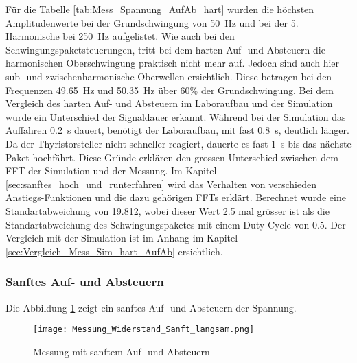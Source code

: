 Für die Tabelle \ref{tab:Mess_Spannung_AufAb_hart} wurden die höchsten Amplitudenwerte bei der Grundschwingung von \SI{50}{Hz} und bei der 5. Harmonische bei \SI{250}{Hz} aufgelistet.
Wie auch bei den Schwingungspaketsteuerungen, tritt bei dem harten Auf- und Absteuern die harmonischen Oberschwingung praktisch nicht mehr auf. Jedoch sind auch hier sub- und zwischenharmonische Oberwellen ersichtlich. Diese betragen bei den Frequenzen \SI{49.65}{Hz} und \SI{50.35}{Hz} über 60\% der Grundschwingung. Bei dem Vergleich des harten Auf- und Absteuern im Laboraufbau und der Simulation wurde ein Unterschied der Signaldauer erkannt. Während bei der Simulation das Auffahren \SI{0.2}{s} dauert, benötigt der Laboraufbau, mit fast \SI{0.8}{s}, deutlich länger. Da der Thyristorsteller nicht schneller reagiert, dauerte es fast \SI{1}{s} bis das nächste Paket hochfährt. Diese Gründe erklären den grossen Unterschied zwischen dem FFT der Simulation und der Messung. Im Kapitel \ref{sec:sanftes_hoch_und_runterfahren} wird das Verhalten von verschieden Anstiegs-Funktionen und die dazu gehörigen FFTs erklärt. Berechnet wurde eine Standartabweichung von 19.812, wobei dieser Wert 2.5 mal grösser ist als die Standartabweichung des Schwingungspaketes mit einem Duty Cycle von 0.5. Der Vergleich mit der Simulation ist im Anhang im Kapitel \ref{sec:Vergleich_Mess_Sim_hart_AufAb} ersichtlich.

\newpage
\subsubsection*{Sanftes Auf- und Absteuern}
Die Abbildung \ref{fig:Mess_Sanft_langsam} zeigt ein sanftes Auf- und Absteuern der Spannung.


\begin{figure}[ht!]
	\centering
	\texttt{[image: Messung\_Widerstand\_Sanft\_langsam.png]}	
	\caption{Messung mit sanftem Auf- und Absteuern}\label{fig:Mess_Sanft_langsam}
\end{figure}


